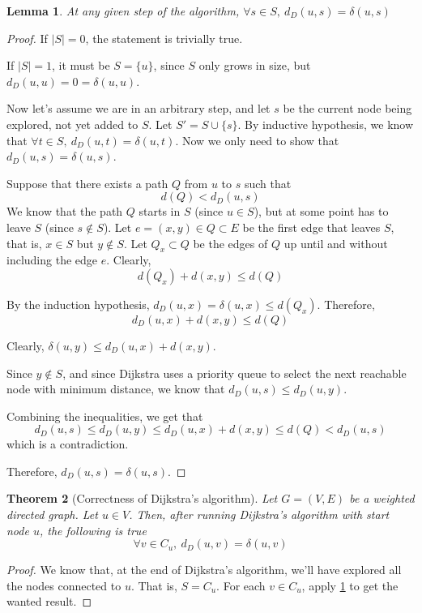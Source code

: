 \documentclass[a4paper,10pt]{report}
\newtheorem{theorem}{Theorem}[chapter]
\newtheorem{lemma}[theorem]{Lemma}
\begin{document}
\begin{lemma}
\label{lemma:dijkstra}
At any given step of the algorithm, $\forall s \in S,\ d_D(u, s) = \delta(u, s)$
\end{lemma}
\begin{proof}
If $|S| = 0$, the statement is trivially true.

If $|S| = 1$, it must be $S = \{u\}$, since $S$ only grows in size, but $d_D(u, u) = 0 = \delta(u, u)$.

Now let's assume we are in an arbitrary step, and let $s$ be the current node being explored, not yet added to $S$. Let $S' = S \cup \{s\}$. By inductive hypothesis, we know that $\forall t \in S,\ d_D(u, t) = \delta(u, t)$. Now we only need to show that $d_D(u, s) = \delta(u, s)$.

Suppose that there exists a path $Q$ from $u$ to $s$ such that
\[d(Q) < d_D(u, s)\]
We know that the path $Q$ starts in $S$ (since $u \in S$), but at some point has to leave $S$ (since $s \not\in S$). Let $e = (x, y) \in Q \subset E$ be the first edge that leaves $S$, that is, $x \in S$ but $y \not\in S$. Let $Q_x \subset Q$ be the edges of $Q$ up until and without including the edge $e$. Clearly,
\[d(Q_x) + d(x, y) \le d(Q)\]

By the induction hypothesis, $d_D(u, x) = \delta(u, x) \le d(Q_x)$. Therefore,
\[ d_D(u, x) + d(x, y) \le d(Q) \]

Clearly, $\delta(u, y) \le d_D(u, x) + d(x, y)$.

Since $y \not\in S$, and since Dijkstra uses a priority queue to select the next reachable node with minimum distance, we know that $d_D(u, s) \le d_D(u, y)$.

Combining the inequalities, we get that
\[ d_D(u, s) \le d_D(u, y) \le d_D(u, x) + d(x, y) \le d(Q) < d_D(u, s) \]
which is a contradiction.

Therefore, $d_D(u, s) = \delta(u, s)$.
\end{proof}

\begin{theorem}[Correctness of Dijkstra's algorithm]
\label{thm:dijkstra}
Let $G = (V, E)$ be a weighted directed graph. Let $u \in V$. Then, after running Dijkstra's algorithm with start node $u$, the following is true
\[ \forall v \in C_u,\  d_D(u, v) = \delta(u, v) \]
\end{theorem}
\begin{proof}
We know that, at the end of Dijkstra's algorithm, we'll have explored all the nodes connected to $u$. That is, $S = C_u$. For each $v \in C_u$, apply \ref{lemma:dijkstra} to get the wanted result.
\end{proof}
\end{document}

